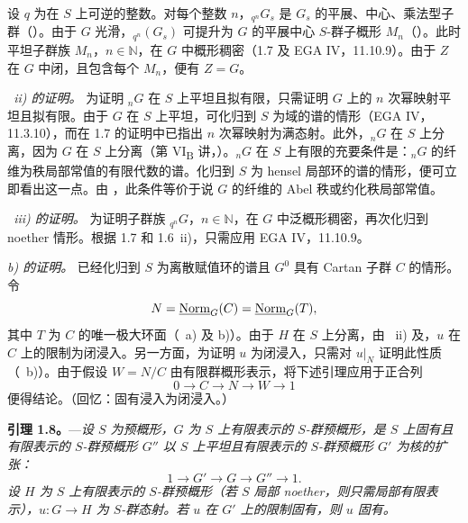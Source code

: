 设 \(q\) 为在 \(S\) 上可逆的整数。对每个整数 \(n\)，\({}_{q^n}G_s\) 是 \(G_s\) 的平展、中心、乘法型子群（）。由于 \(G\) 光滑，\({}_{q^n}(G_s)\) 可提升为 \(G\) 的平展中心 \(S\)-群子概形 \(M_n\)（）。此时平坦子群族 \(M_n\)，\(n\in\mathbb N\)，在 \(G\) 中概形稠密（1.7 及 EGA IV，11.10.9）。由于 \(Z\) 在 \(G\) 中闭，且包含每个 \(M_n\)，便有 \(Z=G\)。

\smallskip
\noindent\textit{~ii) 的证明。}
为证明 \({}_{n}G\) 在 \(S\) 上平坦且拟有限，只需证明 \(G\) 上的 \(n\) 次幂映射平坦且拟有限。由于 \(G\) 在 \(S\) 上平坦，可化归到 \(S\) 为域的谱的情形（EGA IV，11.3.10），而在 1.7 的证明中已指出 \(n\) 次幂映射为满态射。此外，\({}_{n}G\) 在 \(S\) 上分离，因为 \(G\) 在 \(S\) 上分离（第 VI\textsubscript{B} 讲，）。\({}_{n}G\) 在 \(S\) 上有限的充要条件是：\({}_{n}G\) 的纤维为秩局部常值的有限代数的谱。化归到 \(S\) 为 hensel 局部环的谱的情形，便可立即看出这一点。由 ，此条件等价于说 \(G\) 的纤维的 Abel 秩或约化秩局部常值。

\smallskip
\noindent\textit{~iii) 的证明。}
为证明子群族 \({}_{q^n}G\)，\(n\in\mathbb N\)，在 \(G\) 中泛概形稠密，再次化归到 noether 情形。根据 1.7 和 1.6~ii)，只需应用 EGA IV，11.10.9。

\medskip
\noindent\textit{ b) 的证明。}
已经化归到 \(S\) 为离散赋值环的谱且 \(G^0\) 具有 Cartan 子群 \(C\) 的情形。令
\[
  N=\underline{\operatorname{Norm}}_G(C)=\underline{\operatorname{Norm}}_G(T),
\]
其中 \(T\) 为 \(C\) 的唯一极大环面（~a) 及 b)）。由于 \(H\) 在 \(S\) 上分离，由 ~ii) 及，\(u\) 在 \(C\) 上的限制为闭浸入。另一方面，为证明 \(u\) 为闭浸入，只需对 \(u|_N\) 证明此性质（~b)）。由于假设 \(W=N/C\) 由有限群概形表示，将下述引理应用于正合列
\[
  0\longrightarrow C\longrightarrow N\longrightarrow W
  \longrightarrow 1
\]
便得结论。（回忆：固有浸入为闭浸入。）

\medskip
\noindent{}%
\textbf{引理 1.8。}---\textit{设 \(S\) 为预概形，\(G\) 为 \(S\) 上有限表示的 \(S\)-群预概形，是 \(S\) 上固有且有限表示的 \(S\)-群预概形 \(G''\) 以 \(S\) 上平坦且有限表示的 \(S\)-群预概形 \(G'\) 为核的扩张：}
\[
  1\longrightarrow G'\longrightarrow G\longrightarrow G''
  \longrightarrow 1.
\]
\textit{设 \(H\) 为 \(S\) 上有限表示的 \(S\)-群预概形（若 \(S\) 局部 noether，则只需局部有限表示），\(u:G\to H\) 为 \(S\)-群态射。若 \(u\) 在 \(G'\) 上的限制固有，则 \(u\) 固有。}

